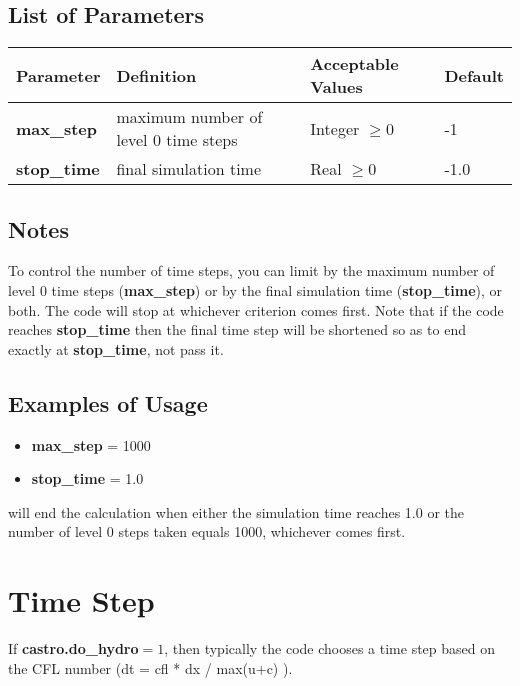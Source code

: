\subsection{List of Parameters}
\begin{table*}[h]
\begin{scriptsize}
\begin{center}
\begin{tabular}{|l|l|l|l|} \hline
Parameter & Definition & Acceptable Values &Default \\
\hline
{\bf max\_step} & maximum number of level 0 time steps & Integer $\geq 0$ & -1 \\
{\bf stop\_time} & final simulation time & Real $\geq 0$ & -1.0 \\
\hline
\end{tabular}
\label{Table:TimeInputs}
\end{center}
\end{scriptsize}
\end{table*}

\subsection{Notes}
To control the number of time steps, you can limit by the maximum number of 
level 0 time steps ({\bf max\_step}) or by the final simulation time ({\bf stop\_time}), 
or both. The code will stop at whichever criterion comes first. 
Note that if the code reaches {\bf stop\_time} then the final time step will be shortened so as to end 
exactly at {\bf stop\_time}, not pass it.

\subsection{Examples of Usage}
\begin{itemize}
\item {\bf max\_step}  = 1000
\item {\bf stop\_time}  = 1.0
\end{itemize}
will end the calculation when either the simulation time reaches 1.0 or 
the number of level 0 steps taken equals 1000, whichever comes first.

\section{Time Step}
If {\bf castro.do\_hydro}$ = 1$, then typically 
the code chooses a time step based on the CFL number (dt = cfl * dx / max(u+c) ).

